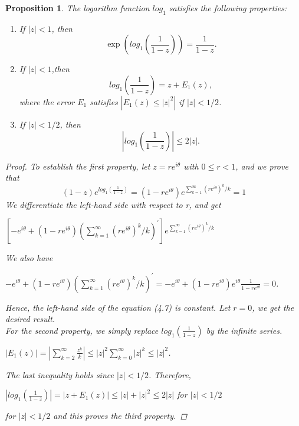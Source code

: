 \documentclass[psamsfonts]{amsart}
\newtheorem{prop}[thm]{Proposition}
\theoremstyle{definition}
\theoremstyle{remark}
\numberwithin{equation}{section}
\begin{document}
			\begin{prop}
				The logarithm function $log_1$ satisfies the following properties:\\
				\begin{enumerate}
					\item If $|z| <1$, then
						\begin{equation}
							\exp({log_1(\frac{1}{1-z})}) = \frac{1}{1-z}.
						\end{equation}
					\item If $|z| < 1$,then
						\begin{equation}
							log_1(\frac{1}{1-z}) = z + E_1(z),
						\end{equation}
						where the error $E_1$ satisfies $\left|E_1(z) \leq |z|^2\right|$ if $|z| < 1/2$.
					\item If $|z| < 1/2$, then
						\begin{equation}
							\left|log_1(\frac{1}{1-z})\right| \leq 2|z|.
						\end{equation}
				\end{enumerate}
				
				\begin{proof}
					To establish the first property, let $z = re^{i\theta}$ with $0 \leq r < 1$, and we prove that 
					\begin{equation}
						(1-z)e^{log_1(\frac{1}{1-z})} = (1-re^{i\theta})e^{\sum_{k=1}^{\infty}(re^{i\theta})^k/k} = 1
					\end{equation}
					\vspace{1mm}
					We differentiate the left-hand side with respect to r, and get
					\begin{center}
						$[-e^{i\theta}+(1-re^{i\theta})(\sum_{k=1}^{\infty} (re^{i\theta})^k/k)^{\prime}] e^{\sum_{k=1}^{\infty}(re^{i\theta})^k/k}$
					\end{center}
					\vspace{1mm}
					We also have
					\begin{center}
						$-e^{i\theta}+(1-re^{i\theta})(\sum_{k=1}^{\infty} (re^{i\theta})^k/k)^{\prime} = -e^{i\theta} + (1-re^{i\theta})e^{i\theta} \frac{1}{1-re^{i\theta}} = 0$.
					\end{center}
					Hence, the left-hand side of the equation (4.7) is constant. Let $r = 0$, we get the desired result.\\
					For the second property, we simply replace $log_1(\frac{1}{1-z})$ by the infinite series.
					\begin{center}
						$|E_1(z)| = \left|\sum_{k=2}^{\infty} \frac{z^k}{k}\right| \leq |z|^2 \sum_{k=0}^{\infty} |z|^k \leq |z|^2$.
					\end{center}
					The last inequality holds since $|z|<1/2$.
					Therefore, 
					\begin{center}
					$\left|log_1(\frac{1}{1-z})\right| = |z + E_1(z)| \leq |z| + |z|^2 \leq 2|z|$ for $|z| < 1/2$
					\end{center}
					for $|z| <1/2$ and this proves the third property.
				\end{proof}
			\end{prop}	
			
\end{document}

